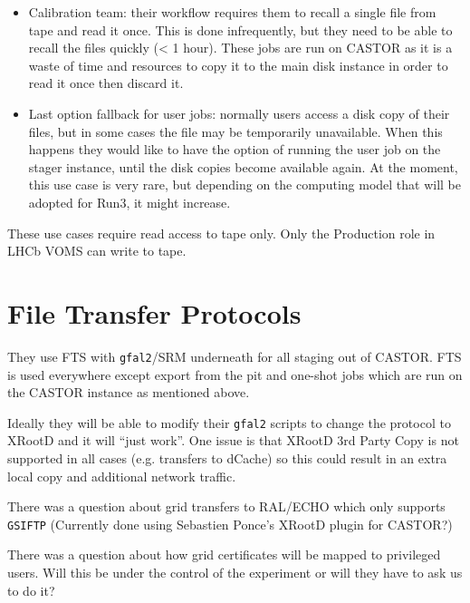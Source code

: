 \documentclass{lhcb+cta}
\begin{document}
\begin{itemize}
    \item Calibration team: their workflow requires them to recall a single file from tape and read it once. This is done infrequently, but they need to be able to recall the files quickly (< 1 hour). These jobs are run on CASTOR as it is a waste of time and resources to copy it to the main disk instance in order to read it once then discard it.
    \item Last option fallback for user jobs: normally users access a disk copy of their files, but in some cases the file may be temporarily unavailable. When this happens they would like to have the option of running the user job on the stager instance, until the disk copies become available again. At the moment, this use case is very rare, but depending on the computing model that will be adopted for Run3, it might increase.
\end{itemize}

These use cases require read access to tape only. Only the Production role in LHCb VOMS can write to tape.

\section*{File Transfer Protocols}

They use FTS with \texttt{gfal2}/SRM underneath for all staging out of CASTOR. FTS is used everywhere except export from the pit and one-shot jobs which are run on the CASTOR instance as mentioned above.

Ideally they will be able to modify their \texttt{gfal2} scripts to change the protocol to XRootD and it will ``just work''. One issue is that XRootD 3rd Party Copy is not supported in all cases (e.g. transfers to dCache) so this could result in an extra local copy and additional network traffic.

There was a question about grid transfers to RAL/ECHO which only supports \texttt{GSIFTP} (Currently done using Sebastien Ponce's XRootD plugin for CASTOR?)

There was a question about how grid certificates will be mapped to privileged users. Will this be under the control of the experiment or will they have to ask us to do it?
\end{document}
